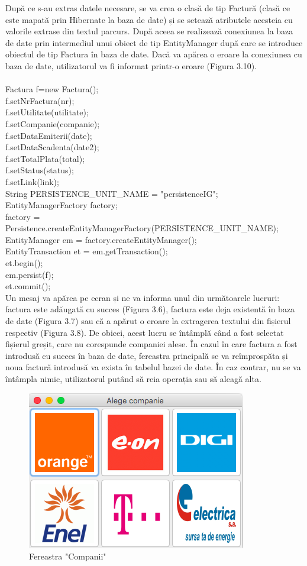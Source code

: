 \documentclass[12pt]{book}
\begin{document}
 După ce s-au extras datele necesare, se va crea o clasă de tip Factură (clasă ce este mapată prin Hibernate la baza de date) și se setează atributele acesteia cu valorile extrase din textul parcurs. După aceea se realizează conexiunea la baza de date prin intermediul unui obiect de tip EntityManager după care se introduce obiectul de tip Factura în baza de date. Dacă va apărea o eroare la conexiunea cu baza de date, utilizatorul va fi informat printr-o eroare (Figura 3.10). \\\\
 Factura f=new Factura();\\
 f.setNrFactura(nr);\\
 f.setUtilitate(utilitate);\\
 f.setCompanie(companie);\\
 f.setDataEmiterii(date);\\
 f.setDataScadenta(date2);\\
 f.setTotalPlata(total);\\
 f.setStatus(status);\\
 f.setLink(link);\\
 String PERSISTENCE\_UNIT\_NAME = "persistenceIG";\\
 EntityManagerFactory factory;\\
 factory = Persistence.createEntityManagerFactory(PERSISTENCE\_UNIT\_NAME);\\
 EntityManager em = factory.createEntityManager();\\
 EntityTransaction et = em.getTransaction();\\
 et.begin();\\
 em.persist(f);\\
 et.commit();\\
 
 Un mesaj va apărea pe ecran și ne va informa unul din următoarele lucruri: factura este adăugată cu succes (Figura 3.6), factura este deja existentă în baza de date (Figura 3.7) sau că a apărut o eroare la extragerea textului din fișierul respectiv (Figura 3.8). De obicei, acest lucru se întâmplă când a fost selectat fișierul greșit, care nu corespunde companiei alese. În cazul în care factura a fost introdusă cu succes în baza de date, fereastra principală se va reîmprospăta și noua factură introdusă va exista în tabelul bazei de date. În caz contrar, nu se va întâmpla nimic, utilizatorul putând să reia operația sau să aleagă alta.
\begin{figure}[!ht]
	\centering
	\includegraphics{Companii}
	\caption{Fereastra "Companii"}
\end{figure}
\end{document}
